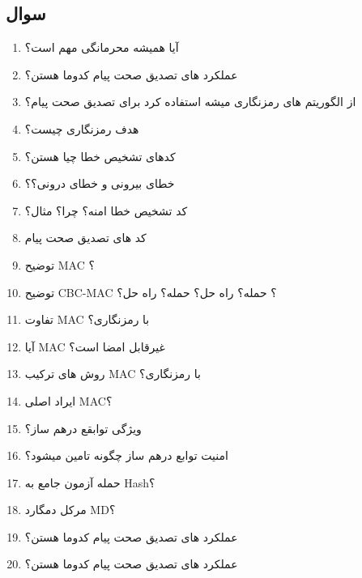\documentclass{report}
\begin{document}
	\subsection{سوال}
	\begin{enumerate}
		\item 
		  آیا همیشه محرمانگی مهم است؟
		\item 
		  عملکرد های تصدیق صحت پیام کدوما هستن؟
		  \item 
		       از الگوریتم های رمزنگاری میشه استفاده کرد برای تصدیق صحت پیام؟
		  
		  \item 
		 هدف رمزنگاری چیست؟
		  \item 
		  کدهای تشخیص خطا چیا هستن؟
		  \item 
		خطای بیرونی و خطای درونی؟؟
		  \item 
  کد تشخیص خطا امنه؟ چرا؟ مثال؟
		  \item 
کد های تصدیق صحت پیام
		  \item 
توضیح MAC ؟
		  \item 
توضیح CBC-MAC ؟ حمله؟ راه حل؟ حمله؟ راه حل؟
		  \item 
تفاوت MAC با رمزنگاری؟
		  \item 
		  آیا MAC غیرقابل امضا است؟
		  \item 
روش های ترکیب MAC با رمزنگاری؟
		  \item 
ایراد اصلی MAC؟
		  \item 
ویژگی توابقع درهم ساز؟
		  \item 
امنیت توابع درهم ساز چگونه تامین میشود؟
		  \item 
حمله آزمون جامع به Hash؟
		  \item 
مرکل دمگارد MD؟ 
		  \item 
عملکرد های تصدیق صحت پیام کدوما هستن؟
		  \item 
عملکرد های تصدیق صحت پیام کدوما هستن؟
		  
	\end{enumerate}
\end{document}
